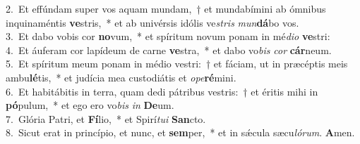 {2.~}Et effúndam super vos aquam mundam,~† et mundabímini ab ómnibus inquinaméntis \textbf{ve}stris,~* et ab univérsis idólis ve\textit{stris} \textit{mun}\textbf{dá}bo vos.\\
{3.~}Et dabo vobis cor \textbf{no}vum,~* et spíritum novum ponam in mé\textit{di}\textit{o} \textbf{ve}stri:\\
{4.~}Et áuferam cor lapídeum de carne \textbf{ve}stra,~* et dabo vo\textit{bis} \textit{cor} \textbf{cár}neum.\\
{5.~}Et spíritum meum ponam in médio vestri:~† et fáciam, ut in præcéptis meis ambu\textbf{lé}tis,~* et judícia mea custodiátis et \textit{o}\textit{pe}\textbf{ré}mini.\\
{6.~}Et habitábitis in terra, quam dedi pátribus vestris:~† et éritis mihi in \textbf{pó}pulum,~* et ego ero vo\textit{bis} \textit{in} \textbf{De}um.\\
{7.~}Glória Patri, et \textbf{Fí}lio,~* et Spirí\textit{tu}\textit{i} \textbf{San}cto.\\
{8.~}Sicut erat in princípio, et nunc, et \textbf{sem}per,~* et in sǽcula sæcu\textit{ló}\textit{rum}. \textbf{A}men.\\
